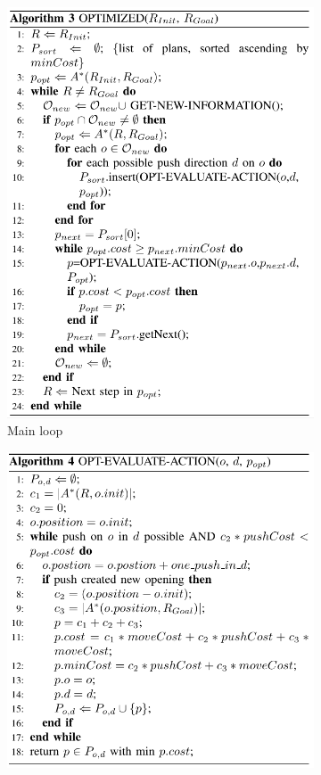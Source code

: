 \begin{figure}[H]
\centering
\begin{subfigure}{.45\textwidth}
  \centering
  \includegraphics[width=\linewidth]{Figures/Wu_Original_Algorithm/algo3.png}
  \caption{Main loop}
  \label{fig:Wu_Original_Algorithm-algo3}
\end{subfigure}%
\begin{subfigure}{.45\textwidth}
  \centering
  \includegraphics[width=\linewidth]{Figures/Wu_Original_Algorithm/algo4.png}

\end{subfigure}
\end{figure}
